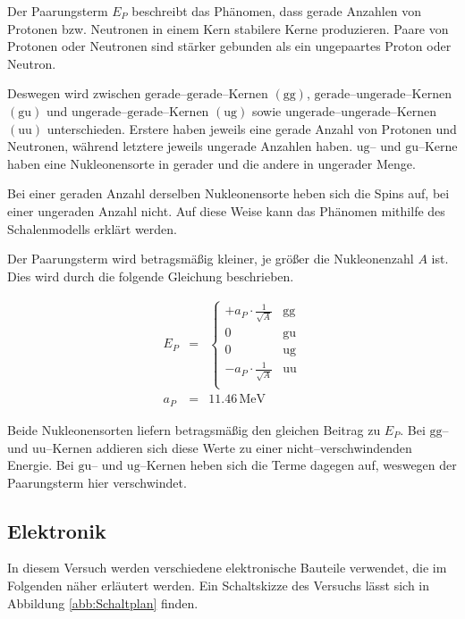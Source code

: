 \documentclass[12pt,a4paper]{scrartcl}
\numberwithin{equation}{section} %
\begin{document}
Der Paarungsterm $E_P$ beschreibt das Phänomen, dass gerade Anzahlen von Protonen bzw. Neutronen in einem Kern stabilere Kerne produzieren. Paare von Protonen oder Neutronen sind stärker gebunden als ein ungepaartes Proton oder Neutron.

Deswegen wird zwischen $\mathrm{gerade}$--$\mathrm{gerade}$--Kernen $(\mathrm{gg})$, $\mathrm{gerade}$--$\mathrm{ungerade}$--Kernen $(\mathrm{gu})$ und $\mathrm{ungerade}$--$\mathrm{gerade}$--Kernen $(\mathrm{ug})$ sowie $\mathrm{ungerade}$--$\mathrm{ungerade}$--Kernen $(\mathrm{uu})$ unterschieden. Erstere haben jeweils eine gerade Anzahl von Protonen und Neutronen, während letztere jeweils ungerade Anzahlen haben. $\mathrm{ug}$-- und $\mathrm{gu}$--Kerne haben eine Nukleonensorte in gerader und die andere in ungerader Menge.

Bei einer geraden Anzahl derselben Nukleonensorte heben sich die Spins auf, bei einer ungeraden Anzahl nicht. Auf diese Weise kann das Phänomen mithilfe des Schalenmodells erklärt werden.

Der Paarungsterm wird betragsmäßig kleiner, je größer die Nukleonenzahl $A$ ist. Dies wird durch die folgende Gleichung beschrieben.

\begin{eqnarray}
	E_P &=&
	\begin{cases}
		+ a_P\cdot \frac{1}{\sqrt{A}} & \text{gg} \\
		0 & \text{gu} \\
		0 & \text{ug} \\
		- a_P\cdot \frac{1}{\sqrt{A}} & \text{uu} \\
	\end{cases}
	\label{Paarungsterm} \\
	a_P &=& 11.46\mathrm{\,MeV}
\end{eqnarray}

\noindent
Beide Nukleonensorten liefern betragsmäßig den gleichen Beitrag zu $E_P$. Bei $\mathrm{gg}$-- und $\mathrm{uu}$--Kernen addieren sich diese Werte zu einer nicht--verschwindenden Energie. Bei $\mathrm{gu}$-- und $\mathrm{ug}$--Kernen heben sich die Terme dagegen auf, weswegen der Paarungsterm hier verschwindet.

\newpage
\hypertarget{elektronik}{%
\subsection{Elektronik}\label{elektronik}}

In diesem Versuch werden verschiedene elektronische Bauteile verwendet, die im Folgenden näher erläutert werden. Ein Schaltskizze des Versuchs lässt sich in Abbildung \ref{abb:Schaltplan} finden.
\end{document}
